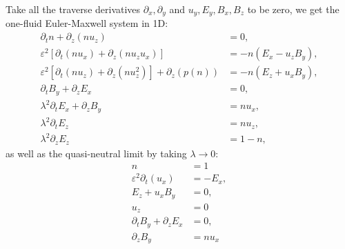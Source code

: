 \documentclass{report}
\begin{document}
Take all the traverse derivatives $\partial_x, \partial_y$ and $u_y, E_y, B_x, B_z$ to be zero, we get the one-fluid Euler-Maxwell system in 1D:
\begin{align*}
    \partial_t n + \partial_z(nu_z) &= 0, \\
    \varepsilon^2[\partial_t(nu_x) + \partial_z(nu_zu_x)] &= - n(E_x - u_zB_y), \\
    \varepsilon^2[\partial_t(nu_z) + \partial_z(nu_z^2)] + \partial_z(p(n)) &= -n(E_z + u_xB_y), \\
    \partial_t B_y + \partial_z E_x &= 0, \\
    \lambda^2 \partial_t E_x + \partial_z B_y &= nu_x, \\
    \lambda^2 \partial_t E_z &= nu_z, \\
    \lambda^2 \partial_z E_z &= 1 - n,
\end{align*}
as well as the quasi-neutral limit by taking $\lambda \rightarrow 0$:
\begin{align*}
    n &= 1\\
    \varepsilon^2 \partial_t(u_x) &= - E_x, \\
    E_z + u_xB_y &= 0, \\
    u_z &= 0 \\
    \partial_t B_y + \partial_z E_x &= 0, \\
    \partial_z B_y &= nu_x
\end{align*}
\end{document}
